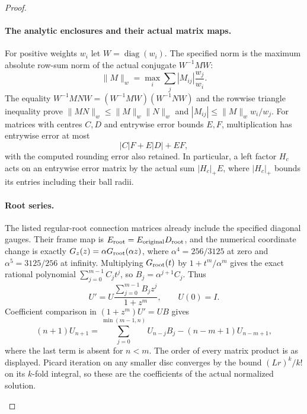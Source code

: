 \begin{proof}
\begin{enumerate}[label=\arabic*.]
\paragraph{The analytic enclosures and their actual matrix maps.}
For positive weights $w_i$ let $W=\operatorname{diag}(w_i)$. The
specified norm is the maximum absolute row-sum norm of the actual
conjugate $W^{-1}MW$:
\[
 \|M\|_w=\max_i\sum_j|M_{ij}|\frac{w_j}{w_i}.
\]
The equality $W^{-1}MNW=(W^{-1}MW)(W^{-1}NW)$ and the rowwise
triangle inequality prove
$\|MN\|_w\le\|M\|_w\|N\|_w$ and
$|M_{ij}|\le\|M\|_w w_i/w_j$. For matrices with centres $C,D$
and entrywise error bounds $E,F$, multiplication has entrywise
error at most
\[
 |C|F+E|D|+EF,
\]
with the computed rounding error also retained. In particular, a
left factor $H_c$ acts on an entrywise error matrix by the actual
sum $|H_c|_+E$, where $|H_c|_+$ bounds its entries including their
ball radii.

\paragraph{Root series.}
The listed regular-root connection matrices already include the
specified diagonal gauges. Their frame map is
$E_{\rm root}=E_{\rm original}D_{\rm root}$, and the numerical
coordinate change is exactly
$G_z(z)=\alpha G_{\rm root}(\alpha z)$, where
$\alpha^4=256/3125$ at zero and $\alpha^5=3125/256$ at infinity.
Multiplying $G_{\rm root}(t)$ by $1+t^m/\alpha^m$ gives the exact
rational polynomial $\sum_{j=0}^{m-1}C_jt^j$, so
$B_j=\alpha^{j+1}C_j$. Thus
\[
 U'=U\frac{\sum_{j=0}^{m-1}B_jz^j}{1+z^m},\qquad U(0)=I.\tag{1.18.2}
\]
Coefficient comparison in $(1+z^m)U'=UB$ gives
\[
 (n+1)U_{n+1}
 =\sum_{j=0}^{\min(m-1,n)}U_{n-j}B_j
   -(n-m+1)U_{n-m+1},
\]
where the last term is absent for $n<m$. The order of every
matrix product is as displayed. Picard iteration on any smaller
disc converges by the bound $(Lr)^k/k!$ on its $k$-fold integral,
so these are the coefficients of the actual normalized solution.


\end{enumerate}
\end{proof}
